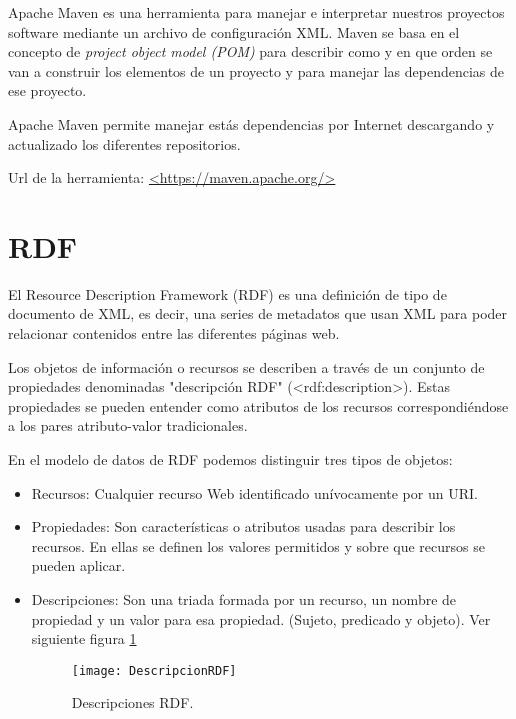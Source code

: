 Apache Maven es una herramienta para manejar e interpretar nuestros proyectos software mediante un archivo de configuración XML. Maven se basa en el concepto de \textit{project object model (POM)} para describir como y en que orden se van a construir los elementos de un proyecto y para manejar las dependencias de ese proyecto.

Apache Maven permite manejar estás dependencias por Internet descargando y actualizado los diferentes repositorios.\cite{wiki:maven}

Url de la herramienta: \url{<https://maven.apache.org/>}

\section{RDF}

El Resource Description Framework (RDF) es una definición de tipo de documento de XML, es decir, una series de metadatos que usan XML para poder relacionar contenidos entre las diferentes páginas web.

Los objetos de información o recursos se describen a través de un conjunto de propiedades denominadas "descripción RDF" (<rdf:description>). Estas propiedades se pueden entender como atributos de los recursos correspondiéndose a los pares atributo-valor tradicionales.

En el modelo de datos de RDF podemos distinguir tres tipos de objetos:

\begin{itemize}
	\item{Recursos}: Cualquier recurso Web identificado unívocamente por un URI.
	\item{Propiedades}: Son características o atributos usadas para describir los recursos. En ellas se definen los valores permitidos y sobre que recursos se pueden aplicar.
	\item{Descripciones}: Son una triada formada por un recurso, un nombre de propiedad y un valor para esa propiedad. (Sujeto, predicado y objeto).
Ver siguiente figura \ref{figDescripcionRDF}

\begin{figure}[h]
    \begin{center}%
        \begin{center}%
          \texttt{[image: DescripcionRDF]}%
          \caption{Descripciones RDF.}%
          \label{figDescripcionRDF}%
        \end{center}%
  	\end{center}%
\end{figure}%

\end{itemize}

